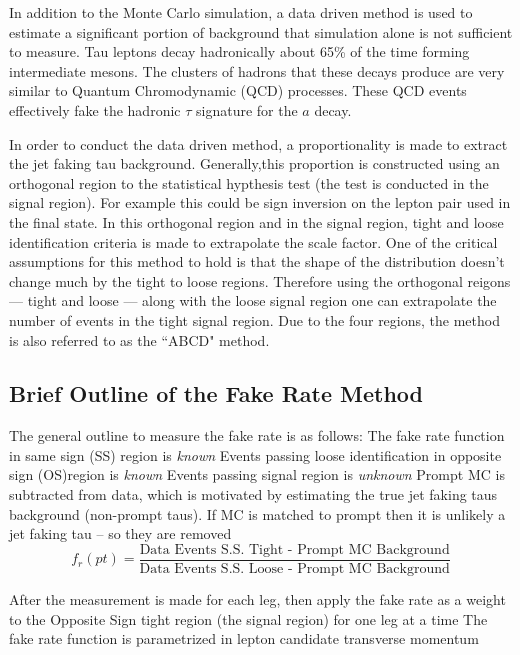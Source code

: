 In addition to the Monte Carlo simulation, a data driven method is used to estimate a significant portion of background that simulation alone is not sufficient to measure. Tau leptons decay hadronically about 65\% of the time forming intermediate mesons. The clusters of hadrons that these decays produce are very similar to Quantum Chromodynamic (QCD) processes. These QCD events effectively fake the hadronic $\tau$ signature for the $a$ decay. 

In order to conduct the data driven method, a proportionality is made to extract the jet faking tau background. Generally,this proportion is constructed using an orthogonal region to the statistical hypthesis test (the test is conducted in the signal region). For example this could be sign inversion on the lepton pair used in the final state. In this orthogonal region and in the signal region, tight and loose identification criteria is made to extrapolate the scale factor. One of the critical assumptions for this method to hold is that the shape of the distribution doesn't change much by the tight to loose regions. Therefore using the orthogonal reigons --- tight and loose --- along with the loose signal region one can extrapolate the number of events in the tight signal region. Due to the four regions, the method is also referred to as the ``ABCD" method. 


\subsection{Brief Outline of the Fake Rate Method}
The general outline to measure the fake rate is as follows:
The fake rate function in same sign (SS) region is \textit{known}
Events passing loose identification in opposite sign (OS)region is \textit{known} 
Events passing signal region is \textit{unknown}
 Prompt MC is subtracted from data, which is motivated by estimating the true jet faking taus background (non-prompt taus). If MC is matched to prompt then it is unlikely a jet faking tau – so they are removed 
\[f_r(pt)=\frac{\text{Data Events S.S. Tight - Prompt MC Background}}{\text{Data Events S.S. Loose - Prompt MC Background}}\] 

After the measurement is made for each leg, then apply the fake rate as a weight to the Opposite Sign tight region (the signal region) for one leg at a time
The fake rate function is parametrized in lepton candidate transverse momentum

